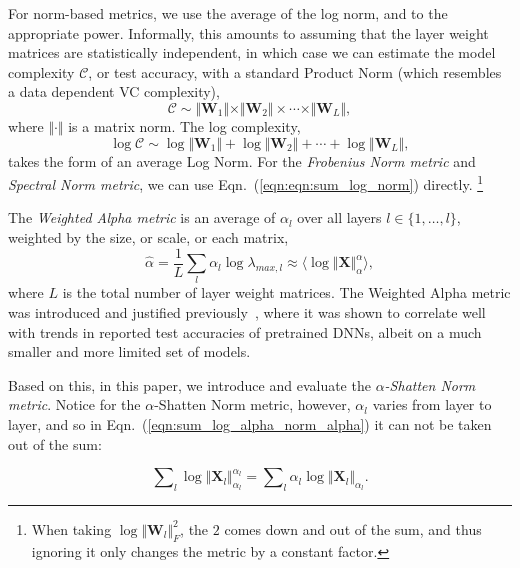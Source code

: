 For norm-based metrics, we use the average of the log norm, and to the appropriate power.
Informally, this amounts to assuming that the layer weight matrices are statistically independent, in which case we can estimate the model complexity $\mathcal{C}$, or test accuracy, with a standard Product Norm (which resembles a data dependent VC complexity),
\begin{equation}
\mathcal{C}\sim\Vert\mathbf{W}_{1}\Vert\times\Vert\mathbf{W}_{2}\Vert \times \cdots \times \Vert\mathbf{W}_{L}\Vert ,
\end{equation}
where $\Vert\cdot\Vert$ is a matrix norm.   
The log complexity,
\begin{equation}
\label{eqn:eqn:sum_log_norm}
\log\mathcal{C} \sim \log\Vert\mathbf{W}_{1}\Vert+\log\Vert\mathbf{W}_{2}\Vert + \cdots + \log\Vert\mathbf{W}_{L}\Vert  ,
\end{equation}
 takes the form of an average Log Norm.
For the \emph{Frobenius Norm metric} and \emph{Spectral Norm metric}, we can use Eqn.~(\ref{eqn:eqn:sum_log_norm}) directly.%
\footnote{When taking $\log\Vert\mathbf{W}_{l}\Vert_{F}^{2}$, the $2$ comes down and out of the sum, and thus ignoring it only changes the metric by a constant factor.}


The \emph{Weighted Alpha metric} is an average of $\alpha_l$ over all layers $l \in \{1,\ldots,l\}$, weighted by the size, or scale, or each matrix,
\begin{equation}
\hat{\alpha} = \dfrac{1}{L}\sum_l \alpha_l\log\lambda_{max,l}\approx\langle\log\Vert\mathbf{X}\Vert_{\alpha}^{\alpha}\rangle    ,
\end{equation}
where $L$ is the total number of layer weight matrices.
The Weighted Alpha metric was introduced and justified previously~\cite{MM20_SDM}, where it was shown to correlate well with trends in reported test accuracies of pretrained DNNs, albeit on a much smaller and more limited set of models.

Based on this, in this paper, we introduce and evaluate the \emph{$\alpha$-Shatten Norm metric}.
Notice for the $\alpha$-Shatten Norm metric, however, $\alpha_l$ varies from layer to layer, and so in Eqn.~(\ref{eqn:sum_log_alpha_norm_alpha}) it can not be taken out of the sum:

\begin{equation}
\label{eqn:sum_log_alpha_norm_alpha}
\sum\nolimits_l \log \Vert\mathbf{X}_l\Vert_{\alpha_l}^{\alpha_l} 
=
\sum\nolimits_l \alpha_l \log \Vert\mathbf{X}_l\Vert_{\alpha_l} .
\end{equation}

